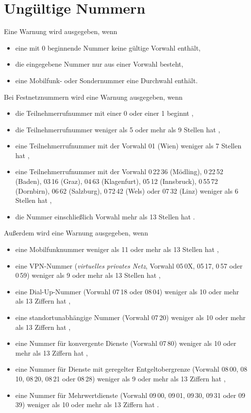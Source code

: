 \documentclass[numbers=noenddot]{scrreprt}
\newcommand{\UeberschriftUngueltig}{\section{Ungültige Nummern}}
\newcommand{\WarnungWenn}{Eine Warnung wird ausgegeben, wenn}
\begin{document}
\UeberschriftUngueltig
\WarnungWenn
\begin{itemize}
\item eine mit 0 beginnende Nummer keine gültige Vorwahl enthält,
\item die eingegebene Nummer nur aus einer Vorwahl besteht,
\item eine Mobilfunk- oder Sondernummer eine Durchwahl enthält.
\end{itemize}
Bei Festnetznummern wird eine Warnung ausgegeben, wenn
\begin{itemize}
\item die Teilnehmerrufnummer mit einer 0 oder einer 1 beginnt \cite[§\,50 (9)]{RTR-Verordnung},
\item die Teilnehmerrufnummer weniger als 5 oder mehr als 9 Stellen hat \cite[§\,50 (3) u. (5)]{RTR-Verordnung},
\item eine Teilnehmerrufnummer mit der Vorwahl 01 (Wien) weniger als 7 Stellen hat \cite[§\,50 (4)]{RTR-Verordnung},
\item eine Teilnehmerrufnummer mit der Vorwahl
0\,22\,36 (Mödling), 0\,22\,52 (Baden), 03\,16 (Graz), 04\,63 (Klagenfurt), 05\,12 (Innsbruck), 0\,55\,72 (Dornbirn), 06\,62 (Salzburg), 0\,72\,42 (Wels) oder 07\,32 (Linz)
weniger als 6 Stellen hat \cite[§\,50 (4)]{RTR-Verordnung},
\item die Nummer einschließlich Vorwahl mehr als 13 Stellen hat \cite[§\,50 (5)]{RTR-Verordnung}.
\end{itemize}
Außerdem wird eine Warnung ausgegeben, wenn
\begin{itemize}
\item eine Mobilfunknummer weniger als 11 oder mehr als 13 Stellen hat \cite[§\,61 (1)]{RTR-Verordnung},
\item eine VPN-Nummer (\emph{virtuelles privates Netz}, Vorwahl
05\,0X, 05\,17, 0\,57 oder 0\,59)
weniger als 9 oder mehr als 13 Stellen hat \cite[§\,56 (1) u. §\,4 (4)]{RTR-Verordnung},
\item eine Dial-Up-Nummer (Vorwahl
07\,18 oder 08\,04)
weniger als 10 oder mehr als 13 Ziffern hat \cite[§\,66]{RTR-Verordnung},
\item eine standortunabhängige Nummer (Vorwahl
07\,20)
weniger als 10 oder mehr als 13 Ziffern hat \cite[§\,71]{RTR-Verordnung},
\item eine Nummer für konvergente Dienste (Vorwahl
07\,80)
weniger als 10 oder mehr als 13 Ziffern hat \cite[§\,76]{RTR-Verordnung},
\item eine Nummer für Dienste mit geregelter Entgeltobergrenze (Vorwahl
08\,00, 08\,10, 08\,20, 08\,21 oder 08\,28)
weniger als 9 oder mehr als 13 Ziffern hat \cite[§\,81]{RTR-Verordnung},
\item eine Nummer für Mehrwertdienste (Vorwahl
09\,00, 09\,01, 09\,30, 09\,31 oder 09\,39)
weniger als 10 oder mehr als 13 Ziffern hat \cite[§\,87]{RTR-Verordnung}.
\end{itemize}
\end{document}
